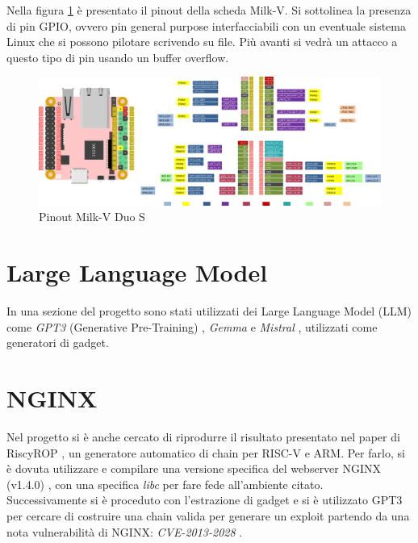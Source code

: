\FloatBarrier
\newpage
Nella figura \ref{ref:duo-pinout} è presentato il pinout della scheda Milk-V. Si sottolinea la presenza di pin GPIO, ovvero pin general purpose interfacciabili con un eventuale sistema Linux che si possono pilotare scrivendo su file. Più avanti si vedrà un attacco a questo tipo di pin usando un buffer overflow.
\vspace{1cm}
\FloatBarrier
\begin{figure}[!htbp]
    \centering
    \includegraphics[width=1\linewidth]{images/duos-pinout.png}
    \caption{Pinout Milk-V Duo S} 
    \label{ref:duo-pinout}
\end{figure}
\FloatBarrier
\vspace{1cm}
\section*{Large Language Model}
In una sezione del progetto sono stati utilizzati dei Large Language Model (LLM) come \textit{GPT3} (Generative Pre-Training) \cite{GPT3}, \textit{Gemma} \cite{Gemma} e \textit{Mistral} \cite{Mistral}, utilizzati come generatori di gadget. 
\section*{NGINX}
Nel progetto si è anche cercato di riprodurre il risultato presentato nel paper di RiscyROP \cite{RiscyROP}, un generatore automatico di chain per RISC-V e ARM. Per farlo, si è dovuta utilizzare e compilare una versione specifica del webserver NGINX (v1.4.0) \cite{NGINX}, con una specifica \textit{libc} per fare fede all'ambiente citato.\\
Successivamente si è proceduto con l'estrazione di gadget e si è utilizzato GPT3 per cercare di costruire una chain valida per generare un exploit partendo da una nota vulnerabilità di NGINX: \textit{CVE-2013-2028} \cite{NGINXcve}.
